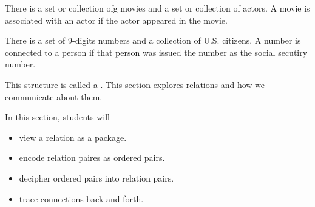 \documentclass{ximera}
\begin{document}
\begin{model}
\begin{example}
\item There is a set or collection ofg movies and a set or collection of actors.  A movie is associated with an actor if the actor appeared in the movie.
\end{example}

\begin{example}
\item There is a set of 9-digits numbers and a collection of U.S. citizens.  A number is connected to a person if that person was issued the number as the social secutiry number.
\end{example}


This structure is called a . This section explores relations and how we communicate about them.


\end{model}








\begin{sectionOutcomes}
In  this section, students will 

\begin{itemize}
\item view a relation as a package.
\item encode relation paires as ordered pairs.
\item decipher ordered pairs into relation pairs.
\item trace connections back-and-forth.
\end{itemize}
\end{sectionOutcomes}
\end{document}

